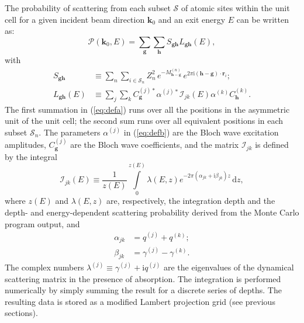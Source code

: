 \documentclass[DIV=calc, paper=letter, fontsize=11pt]{scrartcl}	 %
\begin{document}
The probability of scattering from each subset $\mathcal{S}$ of atomic sites within the 
unit cell for a given incident beam direction $\mathbf{k}_0$ and an exit energy $E$ can be written as:
\begin{equation}
\mathcal{P}(\mathbf{k}_0, E) = \sum_{\mathbf{g}}\sum_{\mathbf{h}} S_{\mathbf{g}\mathbf{h}}L_{\mathbf{g}\mathbf{h}}(E),
    \label{eq:prob}
\end{equation}
with
\begin{subequations}
\begin{align}
    S_{\mathbf{g}\mathbf{h}} &\equiv \sum_{n}\sum_{i\in\mathcal{S}_n} Z^2_n\,e^{-M^{(n)}_{\mathbf{h}-\mathbf{g}}}\,e^{2\pi\mathrm{i} 
    (\mathbf{h}-\mathbf{g})\cdot\mathbf{r}_{i}};\label{eq:defa}\\
    L_{\mathbf{g}\mathbf{h}}(E) &\equiv \sum_{j}\sum_{k} 
    C^{(j)\ast}_{\mathbf{g}}\alpha^{(j)\ast}\mathcal{I}_{jk}(E)\alpha^{(k)}
    C^{(k)}_{\mathbf{h}}.\label{eq:defb}
\end{align}
\end{subequations}
The first summation in (\ref{eq:defa}) runs over all the positions in the asymmetric unit of the unit cell; the second
sum runs over all equivalent positions in each subset $\mathcal{S}_n$.
The parameters $\alpha^{(j)}$ in (\ref{eq:defb}) are the Bloch wave excitation amplitudes, $C_{\mathbf{g}}^{(j)}$ are the 
Bloch wave coefficients, and the matrix $\mathcal{I}_{jk}$ is defined by the integral
\begin{equation}
	\mathcal{I}_{jk}(E)\equiv \frac{1}{z(E)}\int\limits_{0}^{z(E)} 
    \lambda(E,z) e^{-2\pi(\alpha_{jk}+\mathrm{i}\beta_{jk})z}\,\mathrm{d}z,
\end{equation}
where $z(E)$ and $\lambda(E,z)$ are, respectively, the integration depth and the depth- and 
energy-dependent scattering probability derived from the Monte Carlo program output,
and
\begin{subequations}
\begin{align}
    \alpha_{jk} &= q^{(j)}+q^{(k)};\\
    \beta_{jk} &= \gamma^{(j)}-\gamma^{(k)}.
\end{align}
\end{subequations}
The complex numbers $\lambda^{(j)}\equiv\gamma^{(j)}+\mathrm{i}q^{(j)}$ are the eigenvalues of the dynamical scattering matrix in the 
presence of absorption.  The integration is performed numerically by simply summing the result for a discrete series of depths.
The resulting data is stored as a modified Lambert projection grid (see previous sections).  
\end{document}
